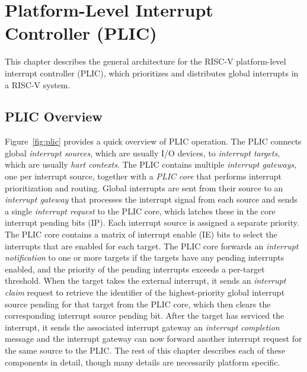 \chapter{Platform-Level Interrupt Controller (PLIC)}
\label{plic}

This chapter describes the general architecture for the RISC-V
platform-level interrupt controller (PLIC), which prioritizes and
distributes global interrupts in a RISC-V system.

\section{PLIC Overview}

Figure~\ref{fig:plic} provides a quick overview of PLIC operation.
The PLIC connects global {\em interrupt sources}, which are usually
I/O devices, to {\em interrupt targets}, which are usually {\em hart
  contexts}.  The PLIC contains multiple {\em interrupt gateways}, one
per interrupt source, together with a {\em PLIC core} that performs
interrupt prioritization and routing.  Global interrupts are sent from
their source to an {\em interrupt gateway} that processes the
interrupt signal from each source and sends a single {\em interrupt
  request} to the PLIC core, which latches these in the core interrupt
pending bits (IP).  Each interrupt source is assigned a separate
priority.  The PLIC core contains a matrix of interrupt enable (IE)
bits to select the interrupts that are enabled for each target.  The
PLIC core forwards an {\em interrupt notification} to one or more
targets if the targets have any pending interrupts enabled, and the
priority of the pending interrupts exceeds a per-target threshold.
When the target takes the external interrupt, it sends an {\em
  interrupt claim} request to retrieve the identifier of the
highest-priority global interrupt source pending for that target from
the PLIC core, which then clears the corresponding interrupt source
pending bit.  After the target has serviced the interrupt, it sends
the associated interrupt gateway an {\em interrupt completion} message
and the interrupt gateway can now forward another interrupt request
for the same source to the PLIC.  The rest of this chapter describes
each of these components in detail, though many details are
necessarily platform specific.

